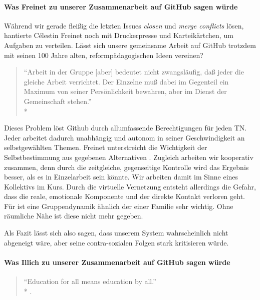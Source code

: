 \paragraph{Was Freinet zu unserer Zusammenarbeit auf GitHub sagen würde}

Während wir gerade fleißig die letzten Issues \emph{closen} und \emph{merge conflicts} lösen, hantierte Célestin Freinet noch mit Druckerpresse und Karteikärtchen, um Aufgaben zu verteilen.
Lässt sich unsere gemeinsame Arbeit auf GitHub trotzdem mit seinen 100 Jahre alten, reformpädagogischen Ideen vereinen?

\begin{quote}
	``Arbeit in der Gruppe [aber] bedeutet nicht zwangsläufig, daß jeder die gleiche Arbeit verrichtet. Der Einzelne muß dabei im Gegenteil ein Maximum von seiner Persönlichkeit bewahren, aber im Dienst der Gemeinschaft stehen.''\\*
	\textcite[510]{Freinet-2000a}
\end{quote}

Dieses Problem löst Github durch allumfassende Berechtigungen für jeden TN.
Jeder arbeitet dadurch unabhängig und autonom in seiner Geschwindigkeit an selbstgewählten Themen.
Freinet unterstreicht die Wichtigkeit der Selbstbestimmung aus gegebenen Alternativen \parencite[vgl.][495]{Freinet-2000a}.
Zugleich arbeiten wir kooperativ zusammen, denn durch die zeitgleiche, gegenseitige Kontrolle wird das Ergebnis besser, als es in Einzelarbeit sein könnte.
Wir arbeiten damit im Sinne eines Kollektivs im Kurs.
Durch die virtuelle Vernetzung entsteht allerdings die Gefahr, dass die reale, emotionale Komponente und der direkte Kontakt verloren geht.
Für \citeauthor{Freinet-2000a} ist eine Gruppendynamik ähnlich der einer Familie sehr wichtig.
Ohne räumliche Nähe ist diese nicht mehr gegeben.

Als Fazit lässt sich also sagen, dass \citeauthor{Freinet-2000a} unserem System wahrscheinlich nicht abgeneigt wäre, aber seine contra-sozialen Folgen stark kritisieren würde.


\paragraph{Was Illich zu unserer Zusammenarbeit auf GitHub sagen würde}

\begin{quote}
	``Education for all means education by all.''\\*
	\textcite[17]{Illich-1971}.
\end{quote}

